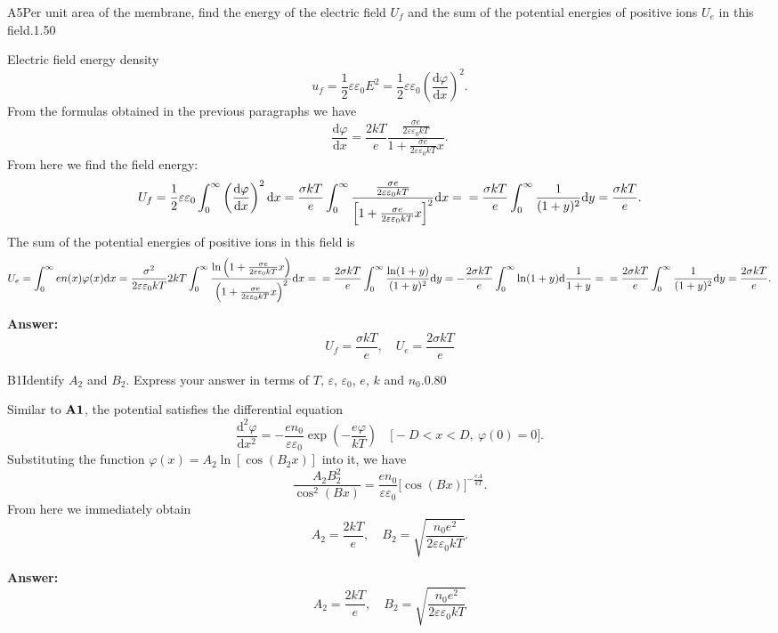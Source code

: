 \documentclass[11pt,a4paper]{article}
\begin{document}
\begin{solcard}{A5}{Per unit area of the membrane, find the energy of the electric field $U_f$ and the sum of the potential energies of positive ions $U_e$ in this field.}{1.50}

Electric field energy density\[u_f=\frac12\varepsilon\varepsilon_0E^2=\frac12\varepsilon\varepsilon_0\left(\frac{\mathrm d\varphi}{\mathrm dx}\right)^2.\]From the formulas obtained in the previous paragraphs we have\[\frac{\mathrm d\varphi}{\mathrm dx}=\frac{2kT}e\frac{\frac{\sigma e}{2\varepsilon\varepsilon_0kT}}{1+\frac{\sigma e}{2\varepsilon\varepsilon_0kT}x}.\]From here we find the field energy:\[U_f=\frac12\varepsilon\varepsilon_0\int_0^{\infty}\left(\frac{\mathrm d\varphi}{\mathrm dx}\right)^2\mathrm dx=\frac{\sigma kT}e\int_0^{\infty}\frac{\frac{\sigma e}{2\varepsilon\varepsilon_0kT}}{\left[1+\frac{\sigma e}{2\varepsilon\varepsilon_0kT}x\right]^{2}}\mathrm dx=\\=\frac{\sigma kT}e\int_0^{\infty}\frac1{(1+y)^2}\mathrm dy=\frac{\sigma kT}e.\]The sum of the potential energies of positive ions in this field is\[U_e=\int_{0}^{\infty} e n(x) \varphi(x) \mathrm{d} x=\frac{\sigma^2}{2\varepsilon\varepsilon_0kT}2kT\int_0^{\infty}\frac{\ln\left(1+\frac{\sigma e}{2\varepsilon\varepsilon_0kT}x\right)}{\left(1+\frac{\sigma e}{2\varepsilon\varepsilon_0kT} x\right)^2}\mathrm dx=\\=\frac{2\sigma kT}e\int_0^{\infty}\frac{\ln(1+y)}{(1+y)^2}\mathrm dy=-\frac{2\sigma kT}e\int_0^{\infty}\ln(1+y)\mathrm d\frac1{1+y}=\\=\frac{2\sigma kT}e\int_0^{\infty}\frac1{(1+y)^2}\mathrm dy=\frac{2\sigma kT}e.\]

\par\smallskip\noindent\textbf{Answer:} \[U_f=\frac{\sigma kT}e,\quad U_e=\frac{2\sigma kT}e\]
\end{solcard}

\begin{solcard}{B1}{Identify $A_2$ and $B_2$. Express your answer in terms of $T$, $\varepsilon$, $\varepsilon_0$, $e$, $k$ and $n_0$.}{0.80}

Similar to $\bf A1$, the potential satisfies the differential equation\[\frac{\mathrm d^2\varphi}{\mathrm dx^2}=-\frac{en_0}{\varepsilon\varepsilon_0}\exp\left(-\frac{e\varphi}{kT}\right)\quad\Big[-D < x < D,\ \varphi(0)=0\Big].\]Substituting the function $\varphi(x)=A_2\ln[\cos(B_2x)]$ into it, we have\[\frac{A_2B_2^2}{\cos^2(Bx)}=\frac{en_0}{\varepsilon\varepsilon_0}\big[\cos(Bx)\big]^{-\frac{eA}{kT}}.\]From here we immediately obtain\[A_2=\frac{2kT}e,\quad B_2=\sqrt{\frac{n_0e^2}{2\varepsilon\varepsilon_0kT}}.\]

\par\smallskip\noindent\textbf{Answer:} \[A_2=\frac{2kT}e,\quad B_2=\sqrt{\frac{n_0e^2}{2\varepsilon\varepsilon_0kT}}\]
\end{solcard}
\end{document}
